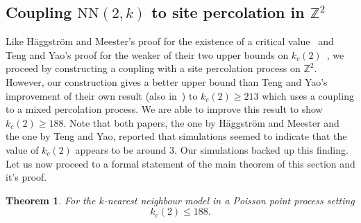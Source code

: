 \documentclass[11pt]{article}
\newtheorem{theorem}{Theorem}[section]
\def\ZZ{\mathbb{Z}}
\def\NN{\mbox{NN}}
\begin{document}
\subsection{Coupling $\NN(2,k)$ to site percolation in $\ZZ^2$}
\label{sec:metric:2d-bounds}

Like H\"aggstr\"om and Meester's proof for the existence of a critical
value~\cite{haggstrom-rsa:1996} and Teng and Yao's proof for the
weaker of their two upper bounds on
$k_c(2)$~\cite{teng-algorithmica:2007}, we proceed by constructing a
coupling with a site percolation process on $\ZZ^2$. However, our
construction gives a better upper bound than Teng and Yao's
improvement of their own result (also
in~\cite{teng-algorithmica:2007}) to $k_c(2) \geq 213$ which uses a
coupling to a mixed percolation process. We are able to improve this
result to show $k_c(2) \geq 188$. Note that both papers, the one by
H\"aggstr\"om and Meester and the one by Teng and Yao, reported that
simulations seemed to indicate that the value of $k_c(2)$ appears to
be around 3. Our simulations backed up this finding. Let us now
proceed to a formal statement of the main theorem of this section and
it's proof.

\begin{theorem}
\label{thm:2d-bound}
For the $k$-nearest neighbour model in a Poisson point process setting
\[k_c(2) \leq 188.\]
\end{theorem}
\end{document}
